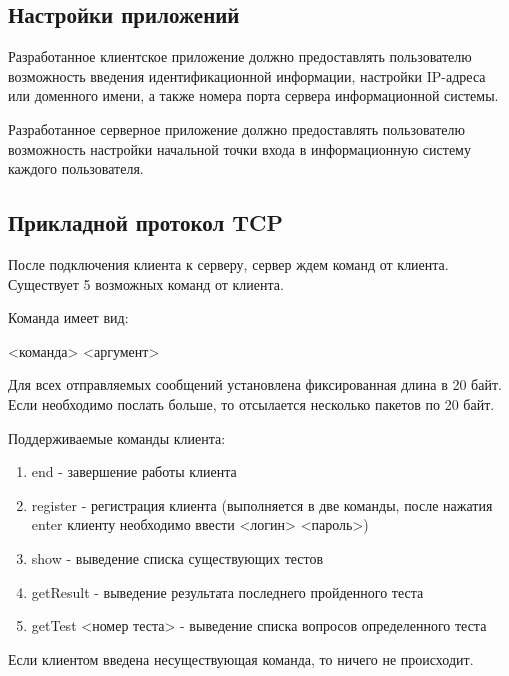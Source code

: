 \vspace{5mm}

\subsection{Настройки приложений}

\vspace{5mm}

Разработанное клиентское приложение должно предоставлять пользователю возможность введения идентификационной информации, настройки IP-адреса или доменного имени, а также номера порта сервера информационной системы.

\vspace{5mm}

Разработанное серверное приложение должно предоставлять пользователю возможность настройки начальной точки входа в информационную систему каждого пользователя.

\subsection{Прикладной протокол TCP}

После подключения клиента к серверу, сервер ждем команд от клиента. Существует 5 возможных команд от клиента. 

Команда имеет вид:

<команда> <аргумент>

\vspace{3mm}

Для всех отправляемых сообщений установлена фиксированная длина в 20 байт. Если необходимо послать больше, то отсылается несколько пакетов по 20 байт. 

Поддерживаемые команды клиента:

\begin{enumerate}
\item end - завершение работы клиента
\item register - регистрация клиента (выполняется в две команды, после нажатия enter клиенту необходимо ввести <логин> <пароль>)
\item show - выведение списка существующих тестов
\item getResult - выведение результата последнего пройденного теста
\item getTest <номер теста> - выведение списка вопросов определенного теста
\end{enumerate}

Если клиентом введена несуществующая команда, то ничего не происходит. 

